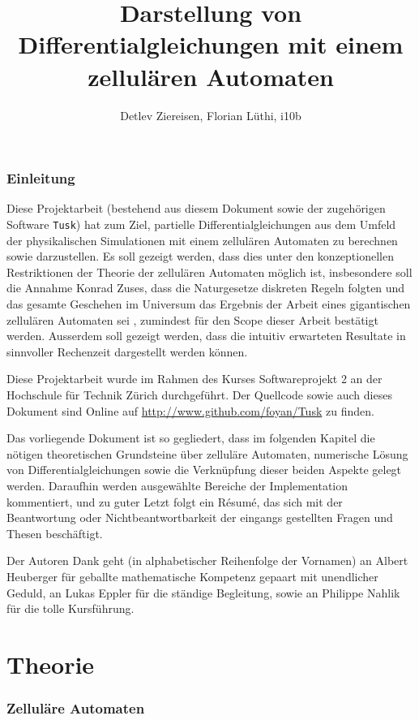 \documentclass[11pt]{article} %
\title{Darstellung von Differentialgleichungen mit einem zellulären Automaten}
\author{Detlev Ziereisen, Florian Lüthi, i10b}
\theoremstyle{definition}
\begin{document}
\maketitle

\tableofcontents

\section{Einleitung}

Diese Projektarbeit (bestehend aus diesem Dokument sowie der zugehörigen Software {\tt Tusk}) hat zum Ziel, partielle Differentialgleichungen aus dem Umfeld der physikalischen Simulationen mit einem zellulären Automaten zu berechnen sowie darzustellen. Es soll gezeigt werden, dass dies unter den konzeptionellen Restriktionen der Theorie der zellulären Automaten möglich ist, insbesondere soll die Annahme Konrad Zuses, dass die Naturgesetze diskreten Regeln folgten und das gesamte Geschehen im Universum das Ergebnis der Arbeit eines gigantischen zellulären Automaten sei \cite{wiki:zellautomat, zuse1969}, zumindest für den Scope dieser Arbeit bestätigt werden. Ausserdem soll gezeigt werden, dass die intuitiv erwarteten Resultate in sinnvoller Rechenzeit dargestellt werden können.

Diese Projektarbeit wurde im Rahmen des Kurses Softwareprojekt 2 an der Hochschule für Technik Zürich durchgeführt. Der Quellcode sowie auch dieses Dokument sind Online auf \url{http://www.github.com/foyan/Tusk} zu finden.

Das vorliegende Dokument ist so gegliedert, dass im folgenden Kapitel die nötigen theoretischen Grundsteine über zelluläre Automaten, numerische Lösung von Differentialgleichungen sowie die Verknüpfung dieser beiden Aspekte gelegt werden. Daraufhin werden ausgewählte Bereiche der Implementation kommentiert, und zu guter Letzt folgt ein Résumé, das sich mit der Beantwortung oder Nichtbeantwortbarkeit der eingangs gestellten Fragen und Thesen beschäftigt.

Der Autoren Dank geht (in alphabetischer Reihenfolge der Vornamen) an Albert Heuberger für geballte mathematische Kompetenz gepaart mit unendlicher Geduld, an Lukas Eppler für die ständige Begleitung, sowie an Philippe Nahlik für die tolle Kursführung.

\part{Theorie}

\section{Zelluläre Automaten}
\end{document}
